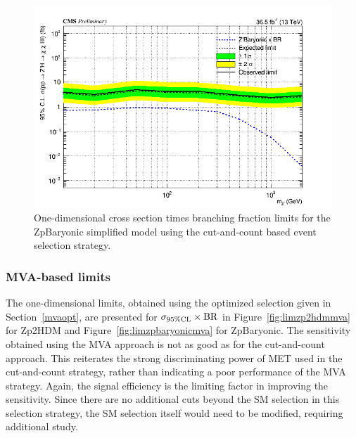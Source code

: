 \begin{figure}[tbh]
\centering
\includegraphics[width=5in]{figures/sigma_limits_4mu_ZpBaryonic.png}
\caption{One-dimensional cross section times branching fraction limits for the ZpBaryonic simplified model using the cut-and-count based event selection strategy.}
\label{fig:limzpbaryonic}
\end{figure}

\subsubsection{MVA-based limits}

The one-dimensional limits, obtained using the optimized selection given in Section~\ref{mvaopt}, are presented for $\sigma_{95\% \rm{CL}}\times \rm{BR}$ in Figure~\ref{fig:limzp2hdmmva} for Zp2HDM and Figure~\ref{fig:limzpbaryonicmva} for ZpBaryonic. The sensitivity obtained using the MVA approach is not as good as for the cut-and-count approach. This reiterates the strong discriminating power of MET used in the cut-and-count strategy, rather than indicating a poor performance of the MVA strategy. Again, the signal efficiency is the limiting factor in improving the sensitivity. Since there are no additional cuts beyond the SM selection in this selection strategy, the SM selection itself would need to be modified, requiring additional study. 

